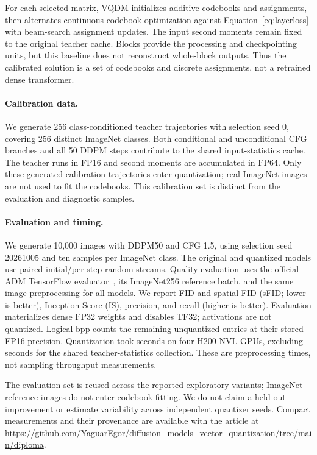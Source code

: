\documentclass{article}
\begin{document}
For each selected matrix, VQDM initializes additive codebooks and assignments, then alternates continuous codebook optimization against Equation~\eqref{eq:layerloss} with beam-search assignment updates. The input second moments remain fixed to the original teacher cache. Blocks provide the processing and checkpointing units, but this baseline does not reconstruct whole-block outputs. Thus the calibrated solution is a set of codebooks and discrete assignments, not a retrained dense transformer.

\paragraph{Calibration data.}
We generate 256 class-conditioned teacher trajectories with selection seed 0, covering 256 distinct ImageNet classes. Both conditional and unconditional CFG branches and all 50 DDPM steps contribute to the shared input-statistics cache. The teacher runs in FP16 and second moments are accumulated in FP64. Only these generated calibration trajectories enter quantization; real ImageNet images are not used to fit the codebooks. This calibration set is distinct from the evaluation and diagnostic samples.

\paragraph{Evaluation and timing.}
We generate 10,000 images with DDPM50 and CFG 1.5, using selection seed 20261005 and ten samples per ImageNet class. The original and quantized models use paired initial/per-step random streams. Quality evaluation uses the official ADM TensorFlow evaluator~\citep{dhariwal2021adm}, its ImageNet256 reference batch, and the same image preprocessing for all models. We report FID and spatial FID (sFID; lower is better), Inception Score (IS), precision, and recall (higher is better). Evaluation materializes dense FP32 weights and disables TF32; activations are not quantized. Logical bpp counts the remaining unquantized entries at their stored FP16 precision. Quantization took \VQSeconds{} seconds on four H200 NVL GPUs, excluding \CalibrationSeconds{} seconds for the shared teacher-statistics collection. These are preprocessing times, not sampling throughput measurements.

The evaluation set is reused across the reported exploratory variants; ImageNet reference images do not enter codebook fitting. We do not claim a held-out improvement or estimate variability across independent quantizer seeds. Compact measurements and their provenance are available with the article at \url{https://github.com/YaguarEgor/diffusion_models_vector_quantization/tree/main/diploma}.
\end{document}
